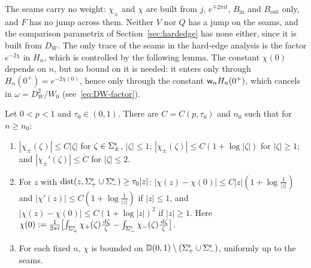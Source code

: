 The seams carry no weight: $\chi_\pm$ and $\chi$ are built from $j$, $e^{\mp2\pi it}$, $B_{\mathrm{in}}$ and
$B_{\mathrm{out}}$ only, and $F$ has no jump across them. Neither $V$ nor $Q$ has a jump on the seams, and the
comparison parametrix of Section~\ref{sec:hardedge} has none either, since it is built from $D_W$. The only trace of the
seams in the hard-edge analysis is the factor $e^{-2\chi}$ in $H_n$, which is controlled by the following lemma. The
constant $\chi(0)$ depends on $n$, but no bound on it is needed: it enters only through $H_n(0^+)=e^{-2\chi(0)}$, hence
only through the constant $\mathsf w_n H_n(0^+)$, which cancels in $\omega=D_W^2/W_0$ (see~\eqref{eq:DW-factor}).

\begin{lemma}\label{lem:corner}
Let $0<p<1$ and $\tau_0\in(0,1)$. There are $C=C(p,\tau_0)$ and $n_0$ such that for $n\ge n_0$:
\begin{enumerate}
\item[(i)] $|\chi_\pm(\zeta)|\le C|\zeta|$ for $\zeta\in\Sigma^{\mathrm{s}}_\pm$, $|\zeta|\le1$; $|\chi_\pm(\zeta)|\le C(1+\log|\zeta|)$ for
  $|\zeta|\ge1$; and $|\chi_\pm'(\zeta)|\le C$ for $|\zeta|\le2$.
\item[(ii)] For $z$ with $\mathrm{dist}(z,\Sigma^{\mathrm{s}}_+\cup\Sigma^{\mathrm{s}}_-)\ge\tau_0|z|$:
  $|\chi(z)-\chi(0)|\le C|z|(1+\log\frac1{|z|})$ and $|\chi'(z)|\le C(1+\log\frac1{|z|})$ if $|z|\le1$, and
  $|\chi(z)-\chi(0)|\le C(1+\log|z|)^2$ if $|z|\ge1$. Here
  $\chi(0):=\frac1{2\pi i}\bigl[\int_{\Sigma^{\mathrm{s}}_+}\chi_+(\zeta)\frac{\,\mathrm{d}\zeta}\zeta-\int_{\Sigma^{\mathrm{s}}_-}\chi_-(\zeta)\frac{\,\mathrm{d}\zeta}\zeta\bigr]$.
\item[(iii)] For each fixed $n$, $\chi$ is bounded on $\mathbb D(0,1)\setminus(\Sigma^{\mathrm{s}}_+\cup\Sigma^{\mathrm{s}}_-)$, uniformly up to the seams.
\end{enumerate}
\end{lemma}

